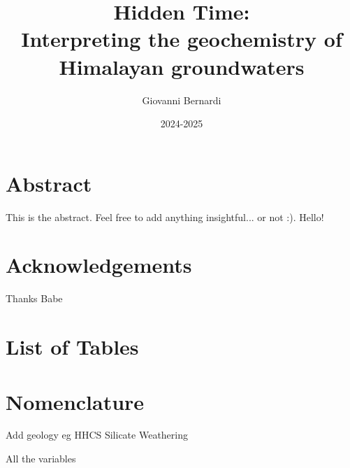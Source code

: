 \documentclass[hidelinks, 11pt]{article} %
\title{
  \vspace{-1cm}
  \textbf{Hidden Time:\\
  Interpreting the geochemistry of Himalayan groundwaters}
  \vspace{0.5cm}
}
\author{Giovanni Bernardi}
\date{2024-2025}
\begin{document}

\maketitle





\thispagestyle{empty}

\newpage

\section*{Abstract}
\label{sec:abstract}

This is the abstract. Feel free to add anything insightful... or not :). Hello!



\newpage


\thispagestyle{empty}

\tableofcontents

\newpage

\thispagestyle{empty}

\section*{Acknowledgements}

Thanks Babe

\newpage

\thispagestyle{empty}

\section*{List of Tables}

\newpage

\thispagestyle{empty}

\section*{Nomenclature}

Add geology eg HHCS
Silicate Weathering 

All the variables

\newpage




\FloatBarrier
{}
\end{document}
